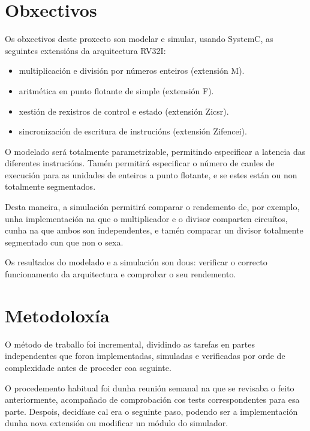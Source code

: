 \section{Obxectivos}
\label{sec:obxectivos}
Os obxectivos deste proxecto son modelar e simular, usando SystemC, as seguintes extensións da arquitectura RV32I: 

\begin{itemize}
    \item multiplicación e división por números enteiros (extensión M).
    \item aritmética en punto flotante de simple (extensión F).
    \item xestión de rexistros de control e estado (extensión Zicsr).
    \item sincronización de escritura de instrucións (extensión Zifencei).
\end{itemize}

O modelado será totalmente parametrizable, permitindo especificar a latencia das diferentes instrucións. Tamén permitirá especificar o número de canles de execución para as unidades de enteiros a punto flotante, e se estes están ou non totalmente segmentados. 

Desta maneira, a simulación permitirá comparar o rendemento de, por exemplo, unha implementación na que o multiplicador e o divisor comparten circuítos, cunha na que ambos son independentes, e tamén comparar un divisor totalmente segmentado cun que non o sexa. 

Os resultados do modelado e a simulación son dous: verificar o correcto funcionamento da arquitectura e comprobar o seu rendemento. 


\section{Metodoloxía}
\label{sec:metodoloxía}
O método de traballo foi incremental, dividindo as tarefas en partes independentes que foron implementadas, simuladas e verificadas por orde de complexidade antes de proceder coa seguinte.

O procedemento habitual foi dunha reunión semanal na que se revisaba o feito anteriormente, acompañado de comprobación cos tests correspondentes para esa parte. Despois, decidíase cal era o seguinte paso, podendo ser a implementación dunha nova extensión ou modificar un módulo do simulador.

